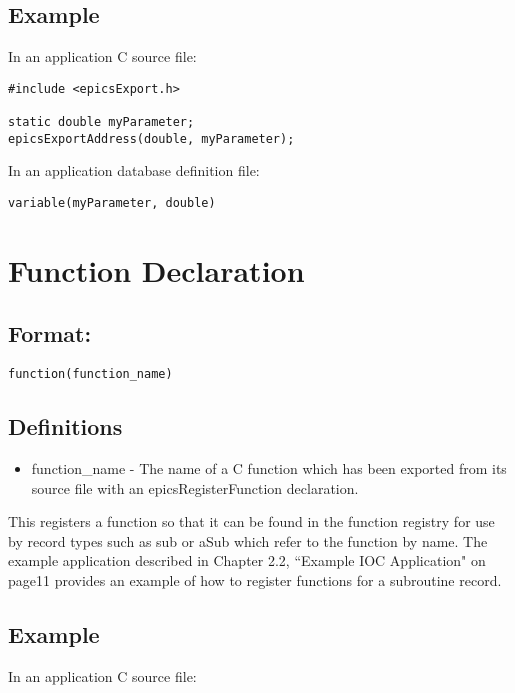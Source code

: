 \subsection{Example}

In an application C source file:

\begin{verbatim}#include <epicsExport.h>

static double myParameter;
epicsExportAddress(double, myParameter);
\end{verbatim}In an application database definition file:

\begin{verbatim}variable(myParameter, double)
\end{verbatim}\section{Function Declaration}

\subsection{Format:}

\begin{verbatim}function(function_name)
\end{verbatim}\subsection{Definitions}

\begin{itemize}\item {}function\_name - The name of a C function which has been exported from its source file with an 
epicsRegisterFunction declaration.

\end{itemize}This registers a function so that it can be found in the function registry for use by record types such as sub or aSub which 
refer to the function by name. The example application described in Chapter 2.2, ``Example IOC Application" on page11 
provides an example of how to register functions for a subroutine record.

\subsection{Example}

In an application C source file:


